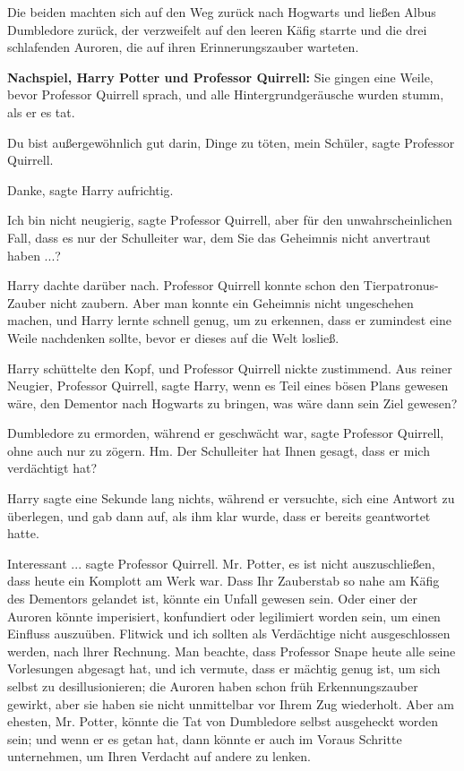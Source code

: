 Die beiden machten sich auf den Weg zurück nach Hogwarts und ließen Albus
Dumbledore zurück, der verzweifelt auf den leeren Käfig starrte und die drei
schlafenden Auroren, die auf ihren Erinnerungszauber warteten.

\textbf{Nachspiel, Harry Potter und Professor Quirrell:}
Sie gingen eine Weile, bevor Professor Quirrell sprach, und alle
Hintergrundgeräusche wurden stumm, als er es tat.

\glqq{}Du bist außergewöhnlich gut darin, Dinge zu töten, mein Schüler\grqq{},
sagte Professor Quirrell.

\glqq{}Danke\grqq{}, sagte Harry aufrichtig.

\glqq{}Ich bin nicht neugierig\grqq{}, sagte Professor Quirrell, \glqq{}aber für
den unwahrscheinlichen Fall, dass es nur der Schulleiter war, dem Sie das
Geheimnis nicht anvertraut haben ...?\grqq{}

Harry dachte darüber nach. Professor Quirrell konnte schon den
Tierpatronus-Zauber nicht zaubern. Aber man konnte ein Geheimnis nicht
ungeschehen machen, und Harry lernte schnell genug, um zu erkennen, dass er
zumindest eine Weile nachdenken sollte, bevor er dieses auf die Welt losließ.

Harry schüttelte den Kopf, und Professor Quirrell nickte zustimmend. \glqq{}Aus
reiner Neugier, Professor Quirrell\grqq{}, sagte Harry, \glqq{}wenn es Teil eines
bösen Plans gewesen wäre, den Dementor nach Hogwarts zu bringen, was wäre dann
sein Ziel gewesen?\grqq{}

\glqq{}Dumbledore zu ermorden, während er geschwächt war\grqq{}, sagte Professor
Quirrell, ohne auch nur zu zögern. \glqq{}Hm. Der Schulleiter hat Ihnen gesagt,
dass er mich verdächtigt hat?\grqq{}

Harry sagte eine Sekunde lang nichts, während er versuchte, sich eine Antwort zu
überlegen, und gab dann auf, als ihm klar wurde, dass er bereits geantwortet
hatte.

\glqq{}Interessant ...\grqq{} sagte Professor Quirrell. \glqq{}Mr. Potter, es ist
nicht auszuschließen, dass heute ein Komplott am Werk war. Dass Ihr Zauberstab
so nahe am Käfig des Dementors gelandet ist, könnte ein Unfall gewesen sein.
Oder einer der Auroren könnte imperisiert, konfundiert oder legilimiert worden
sein, um einen Einfluss auszuüben. Flitwick und ich sollten als Verdächtige
nicht ausgeschlossen werden, nach lhrer Rechnung. Man beachte, dass Professor
Snape heute alle seine Vorlesungen abgesagt hat, und ich vermute, dass er
mächtig genug ist, um sich selbst zu desillusionieren; die Auroren haben schon
früh Erkennungszauber gewirkt, aber sie haben sie nicht unmittelbar vor Ihrem
Zug wiederholt. Aber am ehesten, Mr. Potter, könnte die Tat von Dumbledore
selbst ausgeheckt worden sein; und wenn er es getan hat, dann könnte er auch im
Voraus Schritte unternehmen, um Ihren Verdacht auf andere zu lenken.\grqq{}

